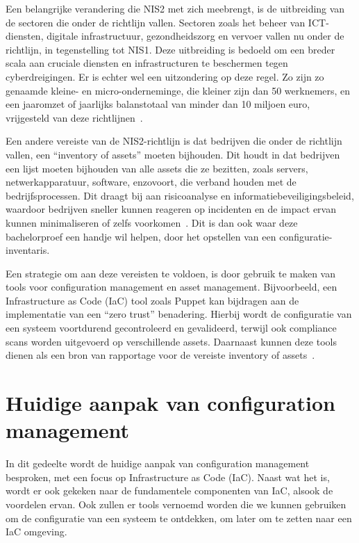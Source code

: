 Een belangrijke verandering die NIS2 met zich meebrengt, is de uitbreiding van de sectoren die onder de richtlijn vallen.
Sectoren zoals het beheer van ICT-diensten, digitale infrastructuur, gezondheidszorg en vervoer vallen nu onder de richtlijn, in tegenstelling tot NIS1.
Deze uitbreiding is bedoeld om een breder scala aan cruciale diensten en infrastructuren te beschermen tegen cyberdreigingen.
Er is echter wel een uitzondering op deze regel.
Zo zijn zo genaamde kleine- en micro-onderneminge, die kleiner zijn dan 50 werknemers, en een jaaromzet of jaarlijks balanstotaal van minder dan 10 miljoen euro, vrijgesteld van deze richtlijnen~\autocite{nis2-eu-be}.


Een andere vereiste van de NIS2-richtlijn is dat bedrijven die onder de richtlijn vallen, een ``inventory of assets'' moeten bijhouden.
Dit houdt in dat bedrijven een lijst moeten bijhouden van alle assets die ze bezitten, zoals servers, netwerkapparatuur, software, enzovoort, die verband houden met de bedrijfsprocessen.
Dit draagt bij aan risicoanalyse en informatiebeveiligingsbeleid, waardoor bedrijven sneller kunnen reageren op incidenten en de impact ervan kunnen minimaliseren of zelfs voorkomen~\autocite{dragos-nis2}.
Dit is dan ook waar deze bachelorproef een handje wil helpen, door het opstellen van een configuratie-inventaris.

Een strategie om aan deze vereisten te voldoen, is door gebruik te maken van tools voor configuration management en asset management.
Bijvoorbeeld, een Infrastructure as Code (IaC) tool zoals Puppet kan bijdragen aan de implementatie van een ``zero trust'' benadering.
Hierbij wordt de configuratie van een systeem voortdurend gecontroleerd en gevalideerd, terwijl ook compliance scans worden uitgevoerd op verschillende assets. Daarnaast kunnen deze tools dienen als een bron van rapportage voor de vereiste inventory of assets~\autocite{puppet-nis2}.


\section{Huidige aanpak van configuration management}%
\label{sec:huidige-aanpak-van-configuration-management}

In dit gedeelte wordt de huidige aanpak van configuration management besproken, met een focus op Infrastructure as Code (IaC).
Naast wat het is, wordt er ook gekeken naar de fundamentele componenten van IaC, alsook de voordelen ervan.
Ook zullen er tools vernoemd worden die we kunnen gebruiken om de configuratie van een systeem te ontdekken, om later om te zetten naar een IaC omgeving.

